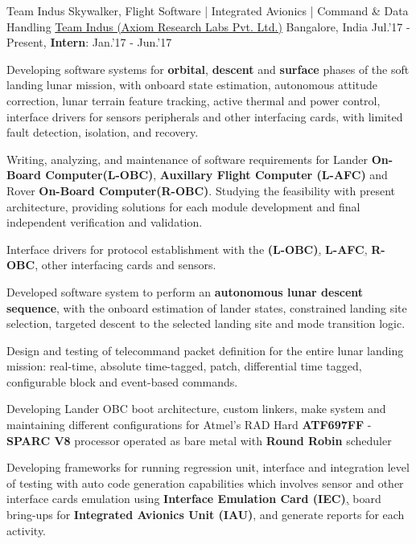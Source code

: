 \begin{cventries}
	\cventry
	{Team Indus Skywalker, Flight Software | Integrated Avionics | Command \& Data Handling}
	{\href{http://www.teamindus.in/}{Team Indus (Axiom Research Labs Pvt. Ltd.)}}
	{Bangalore, India}
	{Jul.'17 - Present, \textbf{Intern}: Jan.'17 - Jun.'17}
	{
		\begin{cvitems}
			\item{Developing software systems for \textbf{orbital}, \textbf{descent} and \textbf{surface} phases of the soft landing lunar mission, with onboard state estimation, autonomous attitude correction, lunar terrain feature tracking, active thermal and power control, interface drivers for sensors peripherals and other interfacing cards, with limited fault detection, isolation, and recovery.}
			\item{Writing, analyzing, and maintenance of software requirements for Lander \textbf{On-Board Computer(L-OBC)}, \textbf{Auxillary Flight Computer (L-AFC)} and Rover \textbf{On-Board Computer(R-OBC)}. Studying the feasibility with present architecture, providing solutions for each module development and final independent verification and validation.}
			\item{Interface drivers for protocol establishment with the \textbf{(L-OBC)}\href{http://ww1.microchip.com/downloads/en/DeviceDoc/ATF697FF.pdf}, \textbf{L-AFC}\href{http://zedboard.org/product/zedboard}, \textbf{R-OBC}\href{http://zedboard.org/product/zedboard}, other interfacing cards and sensors.}
			\item{Developed software system to perform an \textbf{autonomous lunar descent sequence}, with the onboard estimation of lander states, constrained landing site selection, targeted descent to the selected landing site and mode transition logic.}
			\item{Design and testing of telecommand packet definition for the entire lunar landing mission: real-time, absolute time-tagged, patch, differential time tagged, configurable block and event-based commands.}
			\item{Developing Lander OBC boot architecture, custom linkers, make system and maintaining different configurations for Atmel's RAD Hard \textbf{ATF697FF} - \textbf{SPARC V8} processor operated as bare metal with \textbf{Round Robin} scheduler}
			\item{Developing frameworks for running regression unit, interface and integration level of testing with auto code generation capabilities which involves sensor and other interface cards emulation using \textbf{Interface Emulation Card (IEC)}\href{http://zedboard.org/product/microzed/}, board bring-ups for \textbf{Integrated Avionics Unit (IAU)}, and generate reports for each activity.}

\end{cvitems}}
\end{cventries}
